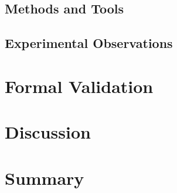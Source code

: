 \subsection{Methods and Tools}\label{sec:methods_and_tools}

\subsection{Experimental Observations}\label{sec:experimental_observations_unobservability}

\section{Formal Validation}\label{sec:formal_validation}

\section{Discussion}\label{sec:validation_discussion}

\section{Summary}\label{sec:validation_summary}
